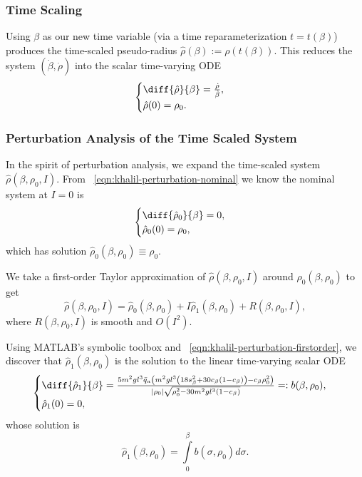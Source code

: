 \subsubsection*{Time Scaling}

Using \(\beta\) as our new time variable (via a time reparameterization
\(t = t(\beta)\)) produces the time-scaled pseudo-radius
\(\hat{\rho}(\beta) := \rho(t(\beta))\).
This reduces the system \((\dot{\beta},\dot{\rho})\) into the scalar time-varying
ODE
\begin{equation}\label{eqn:rhohat-dot}
    \begin{cases}
        \diff{\hat{\rho}}{\beta} = \frac{\dot{\rho}}{\dot{\beta}}
        , \\
        \hat{\rho}(0) = \rho_0
        .
    \end{cases}
\end{equation}

\subsubsection*{Perturbation Analysis of the Time Scaled System}

In the spirit of perturbation analysis, we expand the time-scaled system 
\(\hat{\rho}(\beta,\rho_0,I)\). 
From ~\eqref{eqn:khalil-perturbation-nominal} we know the nominal system at
\(I = 0\) is
\[
    \begin{cases} 
        \diff{\hat{\rho}_0}{\beta} = 0
        , \\
        \hat{\rho}_0(0) = \rho_0
        ,
    \end{cases}
\]
which has solution \(\hat{\rho}_0(\beta,\rho_0) \equiv \rho_0\).

We take a first-order Taylor approximation of \(\hat{\rho}(\beta,\rho_0,I)\)
around \(\hat{\rho}_0(\beta,\rho_0)\) to get
\begin{equation}\label{eqn:acrobot-rhohat-approx}
    \hat{\rho}(\beta,\rho_0,I) = \hat{\rho}_0(\beta,\rho_0) +
    I\hat{\rho}_1(\beta,\rho_0) + R(\beta,\rho_0,I)
    ,
\end{equation}
where \(R(\beta,\rho_0,I)\) is smooth and \(O(I^2)\).

Using MATLAB's symbolic toolbox and 
~\eqref{eqn:khalil-perturbation-firstorder}, 
we discover that \(\hat{\rho}_1(\beta,\rho_0)\) is the solution to the linear
time-varying scalar ODE
\begin{equation}\label{eqn:acrobot-rho1-dot}
  \begin{cases}
      \diff{\hat{\rho}_1}{\beta} =
    \frac{5m^2 g l^3 \bar{q}_a \left(
        m^2gl^3\left(18s_\beta^2 + 30c_\beta(1 - c_\beta)\right)
        - c_\beta\rho_0^2
    \right)}{
    |\rho_0|\sqrt{\rho_0^2 - 30m^2gl^3(1 - c_\beta)}
    }
    =: b(\beta,\rho_0)
     , \\
     \hat{\rho}_1(0) = 0
     ,
 \end{cases}
\end{equation}
whose solution is
\[
    \hat{\rho}_1(\beta,\rho_0) = \int \limits_0^\beta b(\sigma,\rho_0)d\sigma
    .
\]

